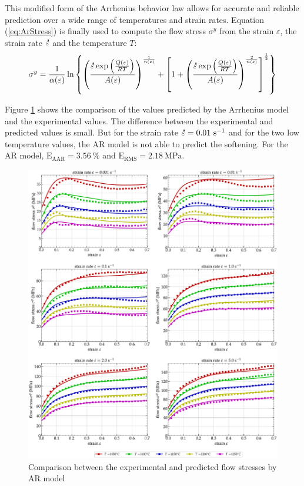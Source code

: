 \documentclass[twoside,english,1p,final,sort&compress]{elsarticle}
\theoremstyle{plain}
\DeclareRobustCommand{\mdot}[1]{\accentset{\mbox{\bfseries .}}{#1}}
\DeclareRobustCommand{\RMSE}{\text{E}_\text{RMS}}
\DeclareRobustCommand{\AARE}{\text{E}_\text{AAR}}
\DeclareRobustCommand{\ps}{\text{s}^{-1}}
\begin{document}
This modified form of the Arrhenius behavior law allows for accurate and reliable prediction over a wide range of temperatures and strain rates.
Equation (\ref{eq:ArStress}) is finally used to compute the flow stress $\sigma^y$ from the strain $\varepsilon$, the strain rate $\mdot\varepsilon$ and the temperature $T$:
\begin{equation}
\sigma^y = \frac{1}{\alpha(\varepsilon)} \ln\left\{\left(\frac{\mdot\varepsilon \exp{\left(\frac{Q(\varepsilon)}{RT}\right)}}{A(\varepsilon)}\right)^{\frac{1}{n(\varepsilon)}} + \left[1 + \left(\frac{\mdot\varepsilon \exp{\left(\frac{Q(\varepsilon)}{RT}\right)}}{A(\varepsilon)}\right)^{\frac{2}{n(\varepsilon)}}\right]^{\frac{1}{2}}\right\}
\label{eq:ArStress}
\end{equation}

Figure \ref{fig:CompExp-AR-6} shows the comparison of the values predicted by the Arrhenius model and the experimental values.
The difference between the experimental and predicted values is small.
But for the strain rate $\mdot\varepsilon = 0.01~\ps$ and for the two low temperature values, the AR model is not able to predict the softening.
For the AR model, $\AARE=3.56~\%$ and $\RMSE=2.18~\text{MPa}$.

\begin{figure}[!ht]
\centering
\includegraphics[width=\columnwidth]
{Figures/CompExp-AR-6}
\caption{Comparison between the experimental and predicted flow stresses by AR model}
\label{fig:CompExp-AR-6}
\end{figure}
\end{document}
